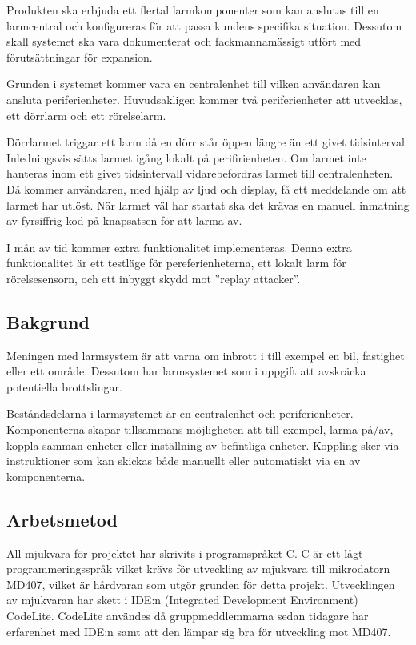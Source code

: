 \documentclass[a4paper]{article}
\begin{document}
Produkten ska erbjuda ett flertal larmkomponenter som kan anslutas till en larmcentral och konfigureras för att passa kundens specifika situation. Dessutom skall systemet ska vara dokumenterat och fackmannamässigt utfört med förutsättningar för expansion.

Grunden i systemet kommer vara en centralenhet till vilken användaren kan ansluta periferienheter. Huvudsakligen kommer två periferienheter att utvecklas, ett dörrlarm och ett rörelselarm.

Dörrlarmet triggar ett larm då en dörr står öppen längre än ett givet tidsinterval. Inledningsvis sätts larmet igång lokalt på perifirienheten. Om larmet inte hanteras inom ett givet tidsintervall vidarebefordras larmet till centralenheten. Då kommer användaren, med hjälp av ljud och display, få ett meddelande om att larmet har utlöst. När larmet väl har startat ska det krävas en manuell inmatning av fyrsiffrig kod på knapsatsen för att larma av.

I mån av tid kommer extra funktionalitet implementeras. Denna extra funktionalitet är ett testläge för pereferienheterna, ett lokalt larm för rörelsesensorn, och ett inbyggt skydd mot ''replay attacker''.

\subsection{Bakgrund}
Meningen med larmsystem är att varna om inbrott i till exempel en bil, fastighet eller ett område. Dessutom har larmsystemet som i uppgift att avskräcka potentiella brottslingar.

Beståndsdelarna i larmsystemet är en centralenhet och periferienheter. Komponenterna skapar tillsammans möjligheten att till exempel, larma på/av, koppla samman enheter eller inställning av befintliga enheter. Koppling sker via instruktioner som kan skickas både manuellt eller automatiskt via en av komponenterna.

\subsection{Arbetsmetod}

All mjukvara för projektet har skrivits i programspråket C. C är ett lågt programmeringsspråk vilket krävs för utveckling av mjukvara till mikrodatorn MD407, vilket är hårdvaran som utgör grunden för detta projekt. Utvecklingen av mjukvaran har skett i IDE:n (Integrated Development Environment) CodeLite. CodeLite användes då gruppmeddlemmarna sedan tidagare har erfarenhet med IDE:n samt att den lämpar sig bra för utveckling mot MD407.
\end{document}
